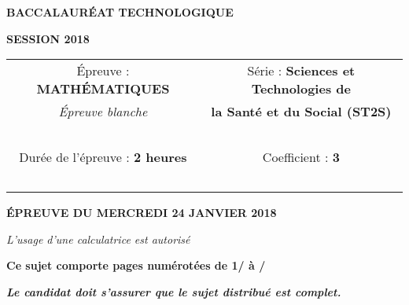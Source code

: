 \begin{center}
	
	{\scshape\LARGE \textbf{BACCALAUR\'EAT TECHNOLOGIQUE} \par}
	\vspace{1cm}
	{\scshape\Large \textbf{SESSION 2018}\par}
	\vspace{1.5cm}
	

	\begin{large}
		\begin{tabular}{|@{\ }c@{\ }|@{\ }c@{\ }|}
		\hline
		\'Epreuve : \textbf{MATH\'EMATIQUES} & Série : \textbf{Sciences et Technologies de}  \\ 
		\textit{\'Epreuve blanche}&  \textbf{la Santé et du Social (ST2S)} \\ \hline
		\ & \ \\
		Durée de l'épreuve : \textbf{2 heures} & Coefficient : \textbf{3} \\ 
		\ & \ \\
		\hline
	\end{tabular}
	\end{large}
		
	\vspace{1cm}
	{\large\bfseries \'EPREUVE DU MERCREDI 24 JANVIER 2018}
	
	\vspace{1cm}
	{\itshape L'usage d'une calculatrice est autorisé\par}
	\vspace{1.5cm}
	{\bfseries Ce sujet comporte \pageref{LastPage} pages numérotées de 1/\pageref{LastPage} à \pageref{LastPage}/\pageref{LastPage} }
	
	
	\vspace{0.5cm}
	{\bfseries\itshape Le candidat doit s'assurer que le sujet distribué est complet. }
	
	\vfill	
	
	
	\vfill

\end{center}
\newpage